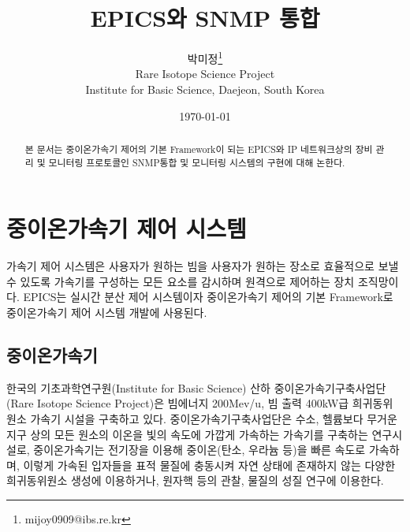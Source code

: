 \documentclass[11pt
  , a4paper
  , article
  , oneside
]{memoir}
\begin{document}
\newcommand{\technumber}{
  RAON Control-Document Series\\
  Revision : v0.1,   Release : Mar. 12. 2015}
\title{\textbf{EPICS와 SNMP 통합}}

\author{박미정\thanks{mijoy0909@ibs.re.kr} \\

  Rare Isotope Science Project\\
  Institute for Basic Science, Daejeon, South Korea
}
\date{\today}


\renewcommand{\maketitlehooka}{\begin{flushright}\textsf{\technumber}\end{flushright}}

\maketitle

\begin{abstract}
본 문서는 중이온가속기 제어의 기본 Framework이 되는 EPICS와 IP 네트워크상의 장비 관리 및 모니터링 프로토콜인 SNMP통합 및 모니터링 시스템의 구현에 대해 논한다.
\end{abstract}

\chapter{중이온가속기 제어 시스템}
가속기 제어 시스템은 사용자가 원하는 빔을 사용자가 원하는 장소로 효율적으로 보낼 수 있도록 가속기를 구성하는 모든 요소를 감시하며 원격으로 제어하는 장치 조직망이다. EPICS는 실시간 분산 제어 시스템이자 중이온가속기 제어의 기본 Framework로 중이온가속기 제어 시스템 개발에 사용된다. 

\section{중이온가속기}
한국의 기초과학연구원(Institute for Basic Science) 산하 중이온가속기구축사업단(Rare Isotope Science Project)은 빔에너지 200Mev/u, 빔 출력 400kW급 희귀동위 원소 가속기 시설을 구축하고 있다. 중이온가속기구축사업단은 수소, 헬륨보다 무거운 지구 상의 모든 원소의 이온을 빛의 속도에 가깝게 가속하는 가속기를 구축하는 연구시설로, 중이온가속기는 전기장을 이용해 중이온(탄소, 우라늄 등)을 빠른 속도로 가속하며, 이렇게 가속된 입자들을 표적 물질에 충동시켜 자연 상태에 존재하지 않는 다양한 희귀동위원소 생성에 이용하거나, 원자핵 등의 관찰, 물질의 성질 연구에 이용한다\citep{raon}\citep{risp}. 
\end{document}
